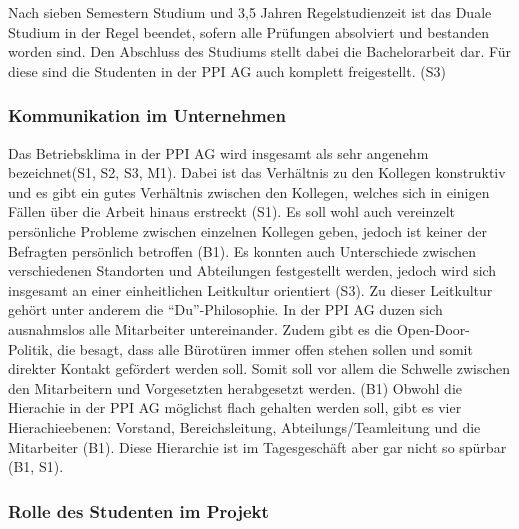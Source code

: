 \documentclass[
  12pt,
  ngerman,
  a4paper,
]{article}
\begin{document}
Nach sieben Semestern Studium und 3,5 Jahren Regelstudienzeit ist das
Duale Studium in der Regel beendet, sofern alle Prüfungen absolviert und
bestanden worden sind. Den Abschluss des Studiums stellt dabei die
Bachelorarbeit dar. Für diese sind die Studenten in der PPI AG auch
komplett freigestellt. (S3)

\hypertarget{kommunikation-im-unternehmen}{%
\subsubsection{Kommunikation im
Unternehmen}\label{kommunikation-im-unternehmen}}

Das Betriebsklima in der PPI AG wird insgesamt als sehr angenehm
bezeichnet(S1, S2, S3, M1). Dabei ist das Verhältnis zu den Kollegen
konstruktiv und es gibt ein gutes Verhältnis zwischen den Kollegen,
welches sich in einigen Fällen über die Arbeit hinaus erstreckt (S1). Es
soll wohl auch vereinzelt persönliche Probleme zwischen einzelnen
Kollegen geben, jedoch ist keiner der Befragten persönlich betroffen
(B1). Es konnten auch Unterschiede zwischen verschiedenen Standorten und
Abteilungen festgestellt werden, jedoch wird sich insgesamt an einer
einheitlichen Leitkultur orientiert (S3). Zu dieser Leitkultur gehört
unter anderem die ``Du''-Philosophie. In der PPI AG duzen sich
ausnahmslos alle Mitarbeiter untereinander. Zudem gibt es die
Open-Door-Politik, die besagt, dass alle Bürotüren immer offen stehen
sollen und somit direkter Kontakt gefördert werden soll. Somit soll vor
allem die Schwelle zwischen den Mitarbeitern und Vorgesetzten
herabgesetzt werden. (B1) Obwohl die Hierachie in der PPI AG möglichst
flach gehalten werden soll, gibt es vier Hierachieebenen: Vorstand,
Bereichsleitung, Abteilungs/Teamleitung und die Mitarbeiter (B1). Diese
Hierarchie ist im Tagesgeschäft aber gar nicht so spürbar (B1, S1).

\hypertarget{rolle-des-studenten-im-projekt}{%
\subsubsection{Rolle des Studenten im
Projekt}\label{rolle-des-studenten-im-projekt}}
\end{document}
